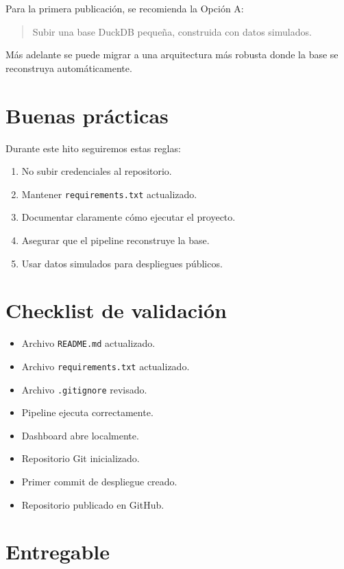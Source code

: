 Para la primera publicación, se recomienda la Opción A:

\begin{quote}
Subir una base DuckDB pequeña, construida con datos simulados.
\end{quote}

Más adelante se puede migrar a una arquitectura más robusta donde la base se reconstruya automáticamente.

\section{Buenas prácticas}

Durante este hito seguiremos estas reglas:

\begin{enumerate}
\item No subir credenciales al repositorio.
\item Mantener \texttt{requirements.txt} actualizado.
\item Documentar claramente cómo ejecutar el proyecto.
\item Asegurar que el pipeline reconstruye la base.
\item Usar datos simulados para despliegues públicos.
\end{enumerate}

\section{Checklist de validación}

\begin{itemize}
\item[$\Box$] Archivo \texttt{README.md} actualizado.
\item[$\Box$] Archivo \texttt{requirements.txt} actualizado.
\item[$\Box$] Archivo \texttt{.gitignore} revisado.
\item[$\Box$] Pipeline ejecuta correctamente.
\item[$\Box$] Dashboard abre localmente.
\item[$\Box$] Repositorio Git inicializado.
\item[$\Box$] Primer commit de despliegue creado.
\item[$\Box$] Repositorio publicado en GitHub.
\end{itemize}

\section{Entregable}

